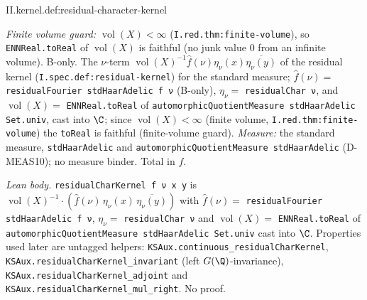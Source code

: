 \begin{definition}
\bonly
{}
\end{definition}
\begin{tfformal}{II.kernel.def:residual-character-kernel}
\begin{tffidelity}
\emph{Finite volume guard:} $\operatorname{vol}(X)<\infty$ (\texttt{I.red.thm:finite-volume}), so \texttt{ENNReal.toReal} of $\operatorname{vol}(X)$ is faithful (no junk value $0$ from an infinite volume).
B-only. The $\nu$-term $\operatorname{vol}(X)^{-1}\hat f(\nu)\eta_\nu(x)\overline{\eta_\nu(y)}$ of the residual kernel (\texttt{I.spec.def:residual-kernel}) for the standard measure; $\hat f(\nu)=$ \texttt{residualFourier stdHaarAdelic f ν} (B-only), $\eta_\nu=$ \texttt{residualChar ν}, and $\operatorname{vol}(X)=$ \texttt{ENNReal.toReal} of \texttt{automorphicQuotientMeasure stdHaarAdelic Set.univ}, cast into $\C$; since $\operatorname{vol}(X)<\infty$ (finite volume, \texttt{I.red.thm:finite-volume}) the \texttt{toReal} is faithful (finite-volume guard). \emph{Measure:} the standard measure, \texttt{stdHaarAdelic} and \texttt{automorphicQuotientMeasure stdHaarAdelic} (D-MEAS10); no measure binder. Total in $f$.
\end{tffidelity}
\end{tfformal}
\noindent\emph{Lean body.} \texttt{residualCharKernel f ν x y} is $\operatorname{vol}(X)^{-1}\cdot(\hat f(\nu)\,\eta_\nu(x)\,\overline{\eta_\nu(y)})$ with $\hat f(\nu)=$ \texttt{residualFourier stdHaarAdelic f ν}, $\eta_\nu=$ \texttt{residualChar ν} and $\operatorname{vol}(X)=$ \texttt{ENNReal.toReal} of \texttt{automorphicQuotientMeasure stdHaarAdelic Set.univ} cast into $\C$. Properties used later are untagged helpers: \texttt{KSAux.continuous\_residualCharKernel}, \texttt{KSAux.residualCharKernel\_invariant} (left $G(\Q)$-invariance), \texttt{KSAux.residualCharKernel\_adjoint} and \texttt{KSAux.residualCharKernel\_mul\_right}. No proof.

